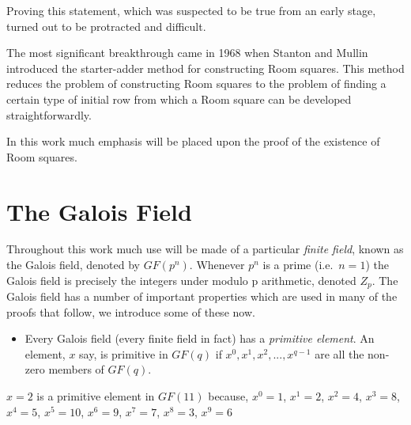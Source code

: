 \documentclass[
  11pt,
  a4paper]{book}
\providecommand{\tightlist}{%
  \setlength{\itemsep}{0pt}\setlength{\parskip}{0pt}}
\newcounter{example}
\begin{document}
Proving this statement, which was suspected to be true from an early
stage, turned out to be protracted and difficult.

The most significant breakthrough came in 1968 when Stanton and Mullin
introduced the starter-adder method for constructing Room squares. This
method reduces the problem of constructing Room squares to the problem
of finding a certain type of initial row from which a Room square can be
developed straightforwardly.

In this work much emphasis will be placed upon the proof of the
existence of Room squares.

\hypertarget{the-galois-field}{%
\section{The Galois Field}\label{the-galois-field}}

Throughout this work much use will be made of a particular \emph{finite
field}, known as the Galois field, denoted by \(GF(p^n)\). Whenever
\(p^n\) is a prime (i.e.~\(n=1\)) the Galois field is precisely the
integers under modulo p arithmetic, denoted \(Z_p\). The Galois field
has a number of important properties which are used in many of the
proofs that follow, we introduce some of these now.

\begin{itemize}
\tightlist
\item
  Every Galois field (every finite field in fact) has a \emph{primitive
  element}. An element, \(x\) say, is primitive in \(GF(q)\) if
  \(x^0,x^1,x^2,...,x^{q-1}\) are all the non-zero members of \(GF(q)\).
\end{itemize}

\begin{example}
$x = 2$ is a primitive element in $GF(11)$ because,
$x^0 = 1$, $x^1 = 2$, $x^2 = 4$, $x^3 = 8$, $x^4 = 5$,
$x^5 = 10$, $x^6 = 9$, $x^7 = 7$, $x^8 = 3$, $x^9 = 6$
\end{example}
\end{document}
